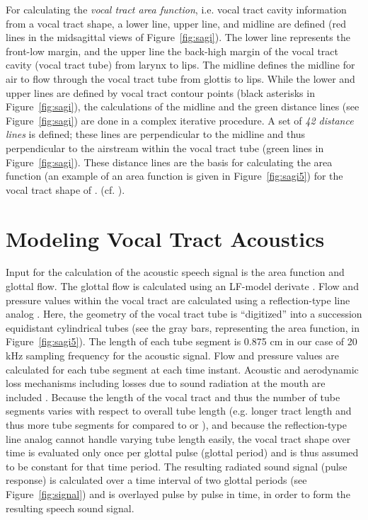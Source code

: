\documentclass[conference]{IEEEtran}
\let\ipa\textipa
\begin{document}
For calculating the \textit{vocal tract area function}, i.e. vocal tract
cavity information from a vocal
tract shape, a lower line, upper line, and midline are defined
(red lines in the midsagittal views of Figure~\ref{fig:sagi}).
The lower line represents the front-low margin,
and the upper line the back-high margin of
the vocal tract cavity (vocal tract tube) from larynx to lips.
The midline defines the midline for air to flow through
the vocal tract tube from glottis to lips.
While the lower and upper lines are defined by vocal
tract contour points (black asterisks in Figure~\ref{fig:sagi}),
the calculations of the midline and the green distance lines
(see Figure~\ref{fig:sagi}) are done in a complex iterative procedure.
A set of \textit{42 distance lines} is defined;
these lines are perpendicular to the midline and thus perpendicular to the
airstream within the vocal tract tube (green lines in
Figure~\ref{fig:sagi}). These distance lines are the basis for
calculating the area function (an example of an area function is
given in Figure~\ref{fig:sagi5}) for the vocal tract shape of \ipa{[A]}. (cf.
\cite{perrier1992}).

\section{Modeling Vocal Tract Acoustics}

Input for the calculation of the acoustic speech signal is the area
function and glottal flow. The glottal flow is calculated using an
LF-model derivate \cite{veldhuis1998}. Flow and pressure values within
the vocal tract are calculated using a reflection-type line analog
\cite{liljencrants1985}. Here, the geometry of the vocal tract tube is
``digitized'' into a succession equidistant cylindrical tubes (see
the gray bars, representing the area function, in
Figure~\ref{fig:sagi5}). The length of each tube segment is 0.875 cm
in our case of 20 kHz sampling frequency for the acoustic signal. Flow
and pressure values are calculated for each tube segment at each time
instant. Acoustic and aerodynamic loss mechanisms including losses due
to sound radiation at the mouth are included \cite{liljencrants1985}.
Because the length of the vocal tract and thus the number of tube
segments varies with respect to overall tube length (e.g. longer tract
length and thus more tube segments for \ipa{[u]} compared to \ipa{[i]}
or \ipa{[A]}), and because the reflection-type line analog cannot handle
varying tube length easily, the vocal tract shape over time is
evaluated only once per glottal pulse (glottal period) and is
thus assumed to be constant for that time period. The
resulting radiated sound signal (pulse response) is calculated over a
time interval of two glottal periods (see Figure~\ref{fig:signal}) and is
overlayed pulse by pulse in time, in order to form the resulting speech
sound signal.
\end{document}
